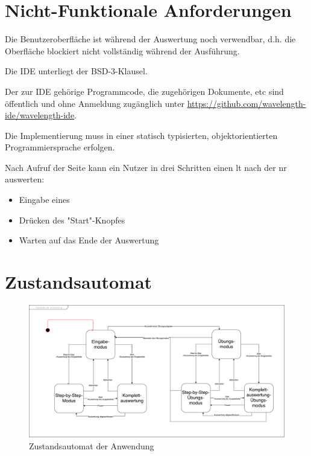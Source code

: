 \documentclass[parskip=full,11pt,twoside]{scrartcl}
\begin{document}

\section{Nicht-Funktionale Anforderungen}


Die Benutzeroberfläche ist während der Auswertung noch verwendbar, d.h. die Oberfläche blockiert nicht vollständig während der Ausführung.

Die IDE unterliegt der BSD-3-Klausel.

Der zur IDE gehörige Programmcode, die zugehörigen Dokumente, etc sind öffentlich und ohne Anmeldung zugänglich unter \href{https://github.com/wavelength-ide/wavelength-ide}{https://github.com/wavelength-ide/wavelength-ide}.

Die Implementierung muss in einer statisch typisierten, objektorientierten Programmiersprache erfolgen.

Nach Aufruf der Seite kann ein Nutzer in drei Schritten einen \gls{lt} nach der \gls{nr} auswerten:
\begin{itemize}
\item Eingabe eines 
\item Drücken des "Start"-Knopfes
\item Warten auf das Ende der Auswertung
\end{itemize}


\section{Zustandsautomat}

\begin{figure}[H]
	\centering
	\includegraphics[width=\textwidth]{img/Zustandsautomat}
	\caption{\label{fig:state} Zustandsautomat der Anwendung}
\end{figure}
\end{document}
